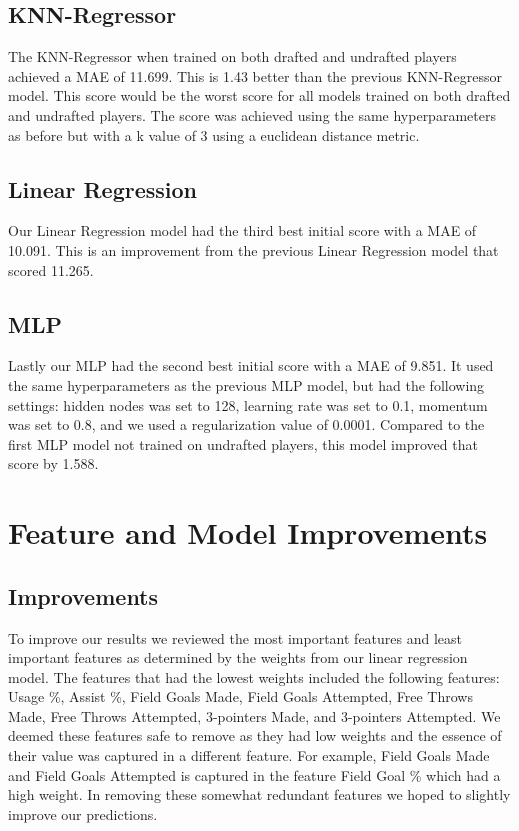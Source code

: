 \documentclass{article}
\begin{document}
\subsection{KNN-Regressor}

The KNN-Regressor when trained on both drafted and undrafted players achieved a MAE of 11.699. This is 1.43 better than 
the previous KNN-Regressor model. This score would be the worst score for all models trained on both drafted and undrafted players.
The score was achieved using the same hyperparameters as before but with a k value of 3 using a euclidean distance metric.

\subsection{Linear Regression}

Our Linear Regression model had the third best initial score with a MAE of 10.091. This is an improvement from the previous 
Linear Regression model that scored 11.265.

\subsection{MLP}

Lastly our MLP had the second best initial score with a MAE of 9.851. It used the same hyperparameters as the previous MLP model, 
but had the following settings: hidden nodes was set to 128, learning rate was set to 0.1, momentum was set to 0.8, and we used a 
regularization value of 0.0001. Compared to the first MLP model not trained on undrafted players, this model improved that score by 1.588.

\section{Feature and Model Improvements}

\subsection{Improvements}

To improve our results we reviewed the most important features and least
important features as determined by the weights from our linear regression
model. The features that had the lowest weights included the following features:
Usage \%, Assist \%, Field Goals Made, Field Goals Attempted, Free Throws Made,
Free Throws Attempted, 3-pointers Made, and 3-pointers Attempted. We deemed
these features safe to remove as they had low weights and the essence of their
value was captured in a different feature. For example, Field Goals Made and
Field Goals Attempted is captured in the feature Field Goal \% which had a high
weight. In removing these somewhat redundant features we hoped to slightly
improve our predictions.
\end{document}
